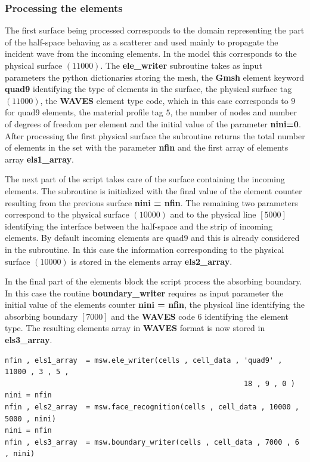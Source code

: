 \documentclass[12pt,letterpaper]{article}
\begin{document}
\subsubsection*{Processing the elements}
The first surface being processed corresponds to the domain representing the part of the half-space behaving as a scatterer and used mainly to propagate the incident wave from the incoming elements. In the model this corresponds to the physical surface $(11000)$.  The {\bf ele\_writer} subroutine takes as input parameters the python dictionaries storing the mesh, the {\bf Gmsh} element keyword {\bf quad9} identifying the type of elements in the surface, the physical surface tag $(11000)$, the {\bf WAVES} element type code, which in this case corresponds to $9$ for quad9 elements, the material profile tag $5$, the number of nodes and number of degrees of freedom per element and the initial value of the parameter {\bf nini=0}. After processing the first physical surface the subroutine returns the total number of elements in the set with the parameter {\bf nfin} and the first array of elements array {\bf els1\_array}.

The next part of the script takes care of the surface containing the incoming elements. The subroutine is initialized with the final value of the element counter resulting from the previous surface {\bf nini = nfin}. The remaining two parameters correspond to the physical surface $(10000)$ and to the physical line $[5000]$ identifying the interface between the half-space and the strip of incoming elements. By default incoming elements are quad9 and this is already considered in the subroutine. In this case the information corresponding to the physical surface $(10000)$ is stored in the elements array  {\bf els2\_array}.

In the final part of the elements block the script process the absorbing boundary. In this case the routine {\bf boundary\_writer} requires as input parameter the initial value of the elements counter {\bf nini = nfin}, the physical line identifying the absorbing boundary $[7000]$ and the {\bf WAVES} code $6$ identifying the element type. The resulting elements array in {\bf WAVES} format  is now stored in {\bf els3\_array}. 

\begin{verbatim}
nfin , els1_array  = msw.ele_writer(cells , cell_data , 'quad9' , 11000 , 3 , 5 ,
                                                        18 , 9 , 0 )
nini = nfin
nfin , els2_array  = msw.face_recognition(cells , cell_data , 10000 , 5000 , nini)
nini = nfin
nfin , els3_array  = msw.boundary_writer(cells , cell_data , 7000 , 6 , nini)
\end{verbatim}
\end{document}
